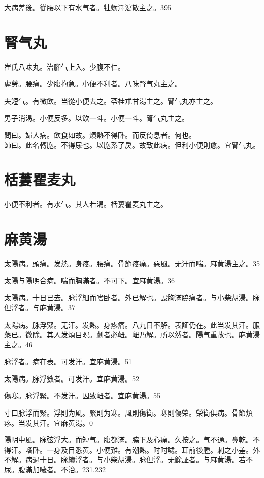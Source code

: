 \documentclass[b5paper,twoside,zihao=-4,UTF8]{ctexbook}
\begin{document}
大病差後。從腰以下有水气者。牡蛎澤瀉散主之。395

\section{腎气丸}

崔氏八味丸。治腳气上入。少腹不仁。

虗勞。腰痛。少腹拘急。小便不利者。八味腎气丸主之。

夫短气。有微飲。当從小便去之。苓桂朮甘湯主之。腎气丸亦主之。

男子消渴。小便反多。以飲一斗。小便一斗。腎气丸主之。

問曰。婦人病。飲食如故。煩熱不得卧。而反倚息者。何也。\\
師曰。此名轉胞。不得尿也。以胞系了戾。故致此病。但利小便則愈。宜腎气丸。

\section{栝蔞瞿麦丸}

小便不利者。有水气。其人若渴。栝蔞瞿麦丸主之。

\section{麻黄湯}

太陽病。頭痛。发熱。身疼。腰痛。骨節疼痛。惡風。无汗而喘。麻黄湯主之。35

太陽与陽明合病。喘而胸滿者。不可下。宜麻黄湯。36

太陽病。十日已去。脉浮細而嗜卧者。外已解也。設胸滿脇痛者。与小柴胡湯。脉{但}浮者。与麻黄湯。37

太陽病。脉浮緊。无汗。发熱。身疼痛。八九日不解。表証仍在。此当发其汗。服藥已。微除。其人发煩目暝。劇者必衄。衄乃解。所以然者。陽气重故也。麻黄湯主之。46

脉浮者。病在表。可发汗。宜麻黄湯。51

{太陽病。}脉浮數者。可发汗。宜麻黄湯。52

傷寒。脉浮緊。不发汗。因致衄者。宜麻黄湯。55

{寸口}脉浮而緊。浮則为風。緊則为寒。風則傷衛。寒則傷榮。榮衛俱病。骨節煩疼。当发其汗。宜麻黄湯。0

陽明中風。脉弦浮大。而短气。腹都滿。脇下及心痛。久按之。气不通。鼻乾。不得汗。嗜卧。一身及目悉黄。小便難。有潮熱。时时噦。耳前後腫。刺之小差。外不解。病過十日。脉續浮者。与{小}柴胡湯。脉但浮。无餘証者。与麻黄湯。若不尿。腹滿加噦者。不治。231.232
\end{document}
